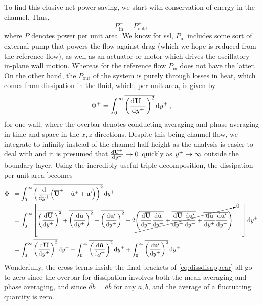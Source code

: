 To find this elusive net power saving, we start with conservation of energy in the channel. Thus,
\begin{equation}
	P_\text{in}^{+}=P_\text{out}^{+}
,\end{equation}
where $P$ denotes power per unit area. We know for \gls{ssl}, $P_\text{in} $ includes some sort of external pump that powers the flow against drag (which we hope is reduced from the reference flow), as well as an actuator or motor which drives the oscillatory in-plane wall motion. Whereas for the reference flow $P_\text{in} $ does not have the latter. On the other hand, the $P_\text{out} $ of the system is purely through losses in heat, which comes from dissipation in the fluid, which, per unit area, is given by
\begin{equation}
	\Phi ^{+}=\int_{0}^{\infty} \overline{\left( \dv{\mathbf{U} \ensuremath{^{+}}}{y\ensuremath{^{+}}}  \right) ^2}  \dd{y\ensuremath{^{+}}} 
,\end{equation}
for one wall, where the overbar denotes conducting averaging and phase averaging in time and space in the $x,z$ directions. Despite this being channel flow, we integrate to infinity instead of the channel half height as the analysis is easier to deal with and it is presumed that $\dv{\mathbf{U}\ensuremath{^{+}}}{y\ensuremath{^{+}}} \to0$ quickly as $y^{+}\to\infty$ outside the boundary layer. Using the incredibly useful triple decomposition, the dissipation per unit area becomes
\begin{align}
	\Phi ^{+}&=\int_{0}^{\infty} \overline{\left( \dv{y\ensuremath{^{+}}}(\overline{\mathbf{U}} ^{+} + \tilde{\mathbf{u} }^{+} + \mathbf{u'} )  \right) ^2}  \dd{y\ensuremath{^{+}}}\\ 
		 &=\int_{0}^{\infty} \left[ \overline{\left( \dv{\overline{\mathbf{U} }}{y\ensuremath{^{+}}}  \right) ^2}+\overline{\left( \dv{\tilde{\mathbf{u} }}{y\ensuremath{^{+}}}  \right) ^2} + \overline{\left(\dv{\mathbf{u'} }{y\ensuremath{^{+}}}\right) ^2} + 2\cancelto{0}{\left( \overline{\dv{ \overline{\mathbf{U} }}{y\ensuremath{^{+}}}\dv{ \tilde{\mathbf{u} }}{y\ensuremath{^{+}}} } + \overline{\dv{ \overline{\mathbf{U} }}{y\ensuremath{^{+}}}\dv{\mathbf{u'} }{y\ensuremath{^{+}}} } + \overline{\dv{ \tilde{\mathbf{u} }}{y\ensuremath{^{+}}}\dv{\mathbf{u'}}{y\ensuremath{^{+}}} } \right)}\phantom{--} \right] \dd{y\ensuremath{^{+}}} \label{eq:dissdisappear}  \\
		 &=\int_{0}^{\infty}  \overline{\left( \dv{\overline{\mathbf{U} }}{y\ensuremath{^{+}}}  \right) ^2}\dd{y\ensuremath{^{+}}}+\int_{0}^{\infty}  \overline{\left( \dv{\tilde{\mathbf{u} }}{y\ensuremath{^{+}}}  \right) ^2} \dd{y\ensuremath{^{+}}} + \int_{0}^{\infty}  \overline{\left(\dv{\mathbf{u'} }{y\ensuremath{^{+}}}\right) ^2} \dd{y\ensuremath{^{+}}}
.\end{align}
Wonderfully, the cross terms inside the final brackets of \ref{eq:dissdisappear} all go to zero since the overbar for dissipation involves both the mean averaging and phase averaging, and since $\overline{\overline{a}b}=\overline{a}\overline{b}$ for any $a,b$, and the average of a fluctuating quantity is zero.
